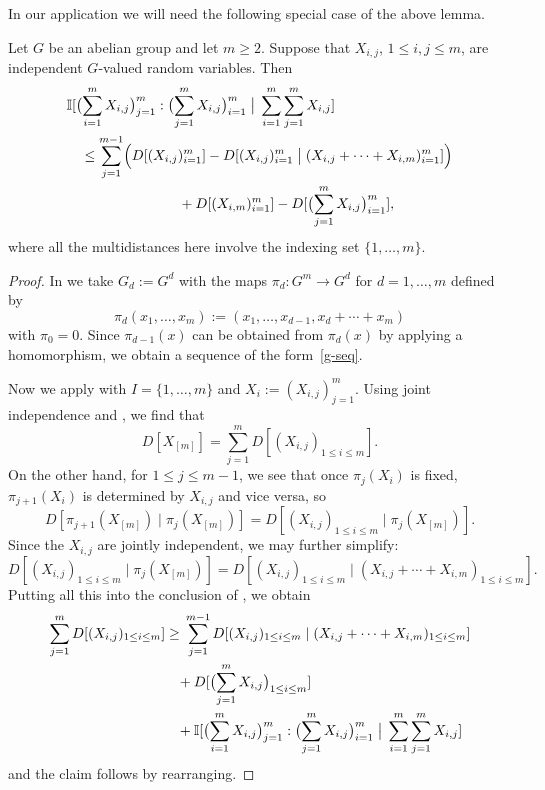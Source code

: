   In our application we will need the following special case of the above lemma.

  \begin{corollary}\label{cor-multid}\leanok Let $G$ be an abelian group and let $m \geq 2$.  Suppose that $X_{i,j}$, $1 \leq i, j \leq m$, are independent $G$-valued random variables.
    Then
    \begin{align*}
      &\mathbb{I}[ \bigl(\sum_{i=1}^m X_{i,j}\bigr)_{j =1}^{m} : \bigl(\sum_{j=1}^m X_{i,j}\bigr)_{i = 1}^m \; \big| \; \sum_{i=1}^m \sum_{j = 1}^m  X_{i,j} ] \\
      &\quad \leq \sum_{j=1}^{m-1} \Bigl(D[(X_{i, j})_{i = 1}^m] - D[ (X_{i, j})_{i = 1}^m  \; \big| \; (X_{i,j} + \cdots + X_{i,m})_{i =1}^m ]\Bigr) \\ & \qquad\qquad\qquad\qquad +  D[(X_{i,m})_{i=1}^m] - D[ \bigl(\sum_{j=1}^m X_{i,j}\bigr)_{i=1}^m ],
    \end{align*}
  where all the multidistances here involve the indexing set $\{1,\dots, m\}$.
  \end{corollary}

  \begin{proof}\leanok
    In  we take $G_d := G^d$ with the maps $\pi_d \colon G^m \to G^d$ for $d=1,\dots,m$ defined by
  \[
    \pi_d(x_1,\dots,x_m) := (x_1,\dots,x_{d-1}, x_d + \cdots + x_m)
  \]
  with $\pi_0=0$. Since $\pi_{d-1}(x)$ can be obtained from $\pi_{d}(x)$ by applying a homomorphism, we obtain a sequence of the form~\eqref{g-seq}.

  Now we apply  with $I = \{1,\dots, m\}$ and $X_i :=  (X_{i,j})_{j = 1}^m$.  Using joint independence and , we find that
  \[
    D[ X_{[m]} ] = \sum_{j=1}^m D[ (X_{i,j})_{1 \leq i \leq m} ].
  \]
  On the other hand, for $1 \leq j \leq m-1$, we see that once $\pi_{j}(X_i)$ is fixed, $\pi_{j+1}(X_i)$ is determined by $X_{i, j}$ and vice versa, so
  \[
    D[ \pi_{j+1}(X_{[m]}) \; | \; \pi_{j}(X_{[m]}) ] = D[ (X_{i, j})_{1 \leq i \leq m} \; | \; \pi_{j}(X_{[m]} )].
  \]
  Since the $X_{i,j}$ are jointly independent, we may further simplify:
  \[
    D[ (X_{i, j})_{1 \leq i \leq m} \; | \; \pi_{j}(X_{[m]})] = D[ (X_{i,j})_{1 \leq i \leq m} \; | \; ( X_{i, j} + \cdots + X_{i, m})_{1 \leq i \leq m} ].
  \]
  Putting all this into the conclusion of , we obtain
  \[
    \sum_{j=1}^{m} D[ (X_{i,j})_{1 \leq i \leq m} ]
    \geq
    \begin{aligned}[t]
    &\sum_{j=1}^{m-1} D[ (X_{i,j})_{1 \leq i \leq m} \; | \; (X_{i,j} + \cdots + X_{i,m})_{1 \leq i \leq m} ] \\
    &\!\!\!+
    D[ \bigl(\sum_{j=1}^m X_{i,j}\bigr)_{1 \leq i \leq m}] \\
    &\!\!\!+\mathbb{I}[  \bigl(\sum_{i=1}^m X_{i,j}\bigr)_{j =1}^{m} : \bigl(\sum_{j=1}^m X_{i,j}\bigr)_{i = 1}^m \; \big| \; \sum_{i=1}^m \sum_{j = 1}^m  X_{i,j} ]
    \end{aligned}
  \]
  and the claim follows by rearranging.
\end{proof}

